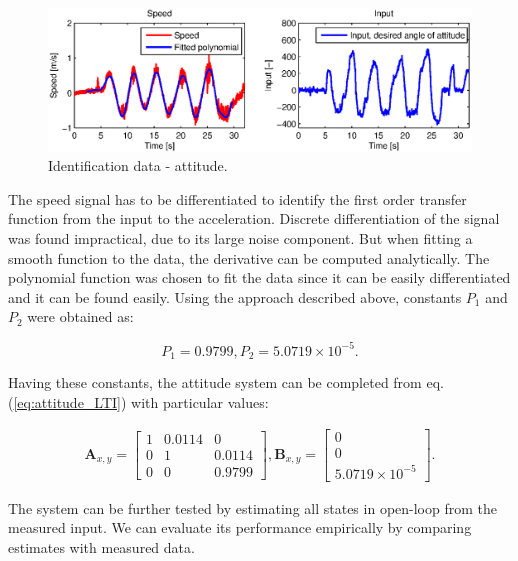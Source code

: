 \begin{figure}[h]
\includegraphics[width=1\textwidth]{fig/iden1.eps} 
\caption{Identification data - attitude.}
\label{fig:iden1}
\end{figure}

The speed signal has to be differentiated to identify the first order transfer function from the input to the acceleration. Discrete differentiation of the signal was found impractical, due to its large noise component. But when fitting a smooth function to the data, the derivative can be computed analytically. The polynomial function was chosen to fit the data since it can be easily differentiated and it can be found easily. Using the approach described above, constants $P_1$ and $P_2$ were obtained as:

\begin{equation}
P_1 = 0.9799, P_2 = 5.0719 \times 10^{-5}.
\label{eq:constants1}
\end{equation}

Having these constants, the attitude system can be completed from eq. (\ref{eq:attitude_LTI}) with particular values:

\begin{equation}
\begin{split}
\mathbf{A}_{x, y} = \begin{bmatrix}
1 & 0.0114 & 0 \\
0 & 1 & 0.0114 \\
0 & 0 & 0.9799
\end{bmatrix}, \mathbf{B}_{x, y} = \begin{bmatrix}
0\\
0\\
5.0719 \times 10^{-5}
\end{bmatrix}.
\end{split}
\label{eq:attitude_LTI_identified}
\end{equation}

The system can be further tested by estimating all states in open-loop from the measured input. We can evaluate its performance empirically by comparing estimates with measured data.

